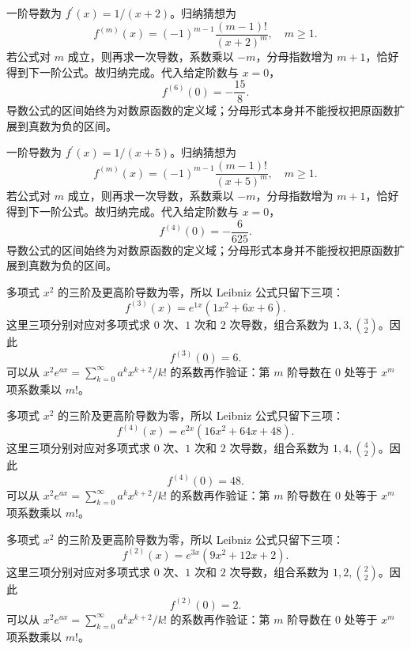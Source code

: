 \documentclass[UTF8,12pt,a4paper,fontset=fandol]{ctexart}
\begin{document}
\begin{solve}\label{ans:c9q17}
一阶导数为 $f^{\prime}(x)=1/(x+2)$。归纳猜想为
\[
f^{(m)}(x)=(-1)^{m-1}\frac{(m-1)!}{(x+2)^m},\quad m\ge1.
\]
若公式对 $m$ 成立，则再求一次导数，系数乘以 $-m$，分母指数增为 $m+1$，恰好得到下一阶公式。故归纳完成。代入给定阶数与 $x=0$，
\[
f^{(6)}(0)=-\frac{15}{8}.
\]
导数公式的区间始终为对数原函数的定义域；分母形式本身并不能授权把原函数扩展到真数为负的区间。
\end{solve}

\begin{solve}\label{ans:c9q18}
一阶导数为 $f^{\prime}(x)=1/(x+5)$。归纳猜想为
\[
f^{(m)}(x)=(-1)^{m-1}\frac{(m-1)!}{(x+5)^m},\quad m\ge1.
\]
若公式对 $m$ 成立，则再求一次导数，系数乘以 $-m$，分母指数增为 $m+1$，恰好得到下一阶公式。故归纳完成。代入给定阶数与 $x=0$，
\[
f^{(4)}(0)=-\frac{6}{625}.
\]
导数公式的区间始终为对数原函数的定义域；分母形式本身并不能授权把原函数扩展到真数为负的区间。
\end{solve}

\begin{solve}\label{ans:c9q19}
多项式 $x^2$ 的三阶及更高阶导数为零，所以 Leibniz 公式只留下三项：
\[
f^{(3)}(x)=e^{1x}\left(1x^2+6x+6\right).
\]
这里三项分别对应对多项式求 $0$ 次、$1$ 次和 $2$ 次导数，组合系数为 $1,3,\binom{3}2$。因此
\[
f^{(3)}(0)=6.
\]
可以从 $x^2e^{ax}=\sum_{k=0}^\infty a^kx^{k+2}/k!$ 的系数再作验证：第 $m$ 阶导数在 $0$ 处等于 $x^m$ 项系数乘以 $m!$。
\end{solve}

\begin{solve}\label{ans:c9q20}
多项式 $x^2$ 的三阶及更高阶导数为零，所以 Leibniz 公式只留下三项：
\[
f^{(4)}(x)=e^{2x}\left(16x^2+64x+48\right).
\]
这里三项分别对应对多项式求 $0$ 次、$1$ 次和 $2$ 次导数，组合系数为 $1,4,\binom{4}2$。因此
\[
f^{(4)}(0)=48.
\]
可以从 $x^2e^{ax}=\sum_{k=0}^\infty a^kx^{k+2}/k!$ 的系数再作验证：第 $m$ 阶导数在 $0$ 处等于 $x^m$ 项系数乘以 $m!$。
\end{solve}

\begin{solve}\label{ans:c9q21}
多项式 $x^2$ 的三阶及更高阶导数为零，所以 Leibniz 公式只留下三项：
\[
f^{(2)}(x)=e^{3x}\left(9x^2+12x+2\right).
\]
这里三项分别对应对多项式求 $0$ 次、$1$ 次和 $2$ 次导数，组合系数为 $1,2,\binom{2}2$。因此
\[
f^{(2)}(0)=2.
\]
可以从 $x^2e^{ax}=\sum_{k=0}^\infty a^kx^{k+2}/k!$ 的系数再作验证：第 $m$ 阶导数在 $0$ 处等于 $x^m$ 项系数乘以 $m!$。
\end{solve}
\end{document}
